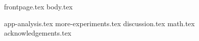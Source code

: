 \documentclass[runningheads]{llncs}
\begin{document}
\ifusenix
  \date{}
\fi

{frontpage.tex}
{body.tex}

\iflncs
  
\fi
\ifoakland
  
\fi
\ifccs
  
\fi
\ifusenix
  
\fi


\appendix

{app-analysis.tex}
{more-experiments.tex}
{discussion.tex}
{math.tex}
\ifanonymous
\else
  {acknowledgements.tex}
\fi
\end{document}

